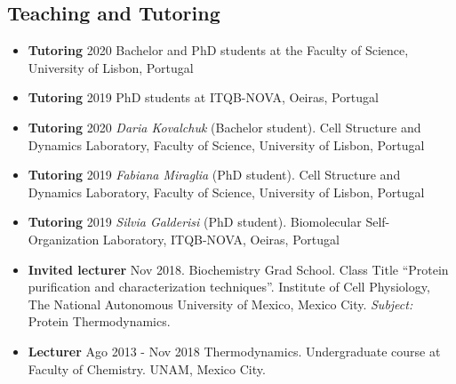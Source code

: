 \documentclass[letterpaper,11pt]{article}
\begin{document}
\subsection*{Teaching and Tutoring}
\begin{itemize}
\item \textbf{Tutoring} 2020 Bachelor and PhD students at the Faculty of Science, University of Lisbon, Portugal  
\item \textbf{Tutoring} 2019 PhD students at ITQB-NOVA, Oeiras, Portugal
\item \textbf{Tutoring} 2020 \textit{Daria Kovalchuk} (Bachelor student). Cell Structure and Dynamics Laboratory, Faculty of Science, University of Lisbon, Portugal  
\item \textbf{Tutoring} 2019 \textit{Fabiana Miraglia} (PhD student). Cell Structure and Dynamics Laboratory, Faculty of Science, University of Lisbon, Portugal 
\item \textbf{Tutoring} 2019 \textit{Silvia Galderisi} (PhD student). Biomolecular Self-Organization Laboratory, ITQB-NOVA, Oeiras, Portugal 
  \item \textbf{Invited lecturer} Nov 2018. Biochemistry Grad School. Class Title “Protein purification and characterization techniques”. Institute of Cell Physiology, The National Autonomous University of Mexico, Mexico City. \textit{Subject:} Protein Thermodynamics.
 \item \textbf{Lecturer} Ago 2013 - Nov 2018 Thermodynamics. Undergraduate course at Faculty of Chemistry. UNAM, Mexico City. %
 \end{itemize}
\end{document}

